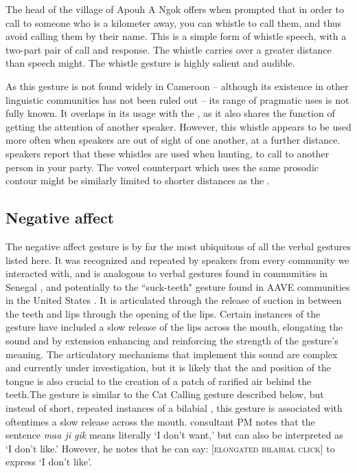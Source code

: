 \documentclass[output=paper
,newtxmath
,modfonts
,nonflat]{langsci/langscibook}
\begin{document}
The head of the village of Apouh A Ngok offers when prompted that in order to call to someone who is a kilometer away, you can whistle to call them, and thus avoid calling them by their name. This is a simple form of whistle speech, with a two-part pair of call and response. The whistle carries over a greater distance than speech might. The whistle gesture is highly salient and audible. 

As this gesture is not found widely in Cameroon -- although its existence in other linguistic communities has not been ruled out -- its range of pragmatic uses is not fully known. It overlaps in its usage with the , as it also shares the function of getting the attention of another speaker.  However, this whistle appears to be used more often when speakers are out of sight of one another, at a further distance.  speakers report that these whistles are used when hunting, to call to another person in your party. The vowel counterpart which uses the same prosodic contour might be similarly limited to shorter distances as the . 

\subsection{Negative affect}\label{subsec:pillion:NegativeAffect}
The negative affect gesture is by far the most ubiquitous of all the verbal gestures listed here. It was recognized and repeated by speakers from every community we interacted with, and is analogous to verbal gestures found in  communities in Senegal \citep{grenobleetal2015}, and potentially to the ``suck-teeth" gesture found in AAVE communities in the United States \citep{rickfordrickford1976}. It is articulated through the release of suction in between the teeth and lips through the opening of the lips. Certain instances of the gesture have included a slow release of the lips across the mouth, elongating the sound and by extension enhancing and reinforcing the strength of the gesture's meaning. The articulatory mechanisms that implement this sound are complex and currently under investigation, but it is likely that the  and position of the tongue is also crucial to the creation of a patch of rarified air behind the teeth.The gesture is similar to the Cat Calling gesture described below, but instead of short, repeated instances of a bilabial , this gesture is associated with oftentimes a slow release across the mouth. %
 consultant PM notes that the sentence \textit{maa ji gik} means literally `I don't want,' but can also be interpreted as `I don't like.' However, he notes that he can say: [\textsc {elongated bilabial click}] to express `I don't like'. %
\end{document}
